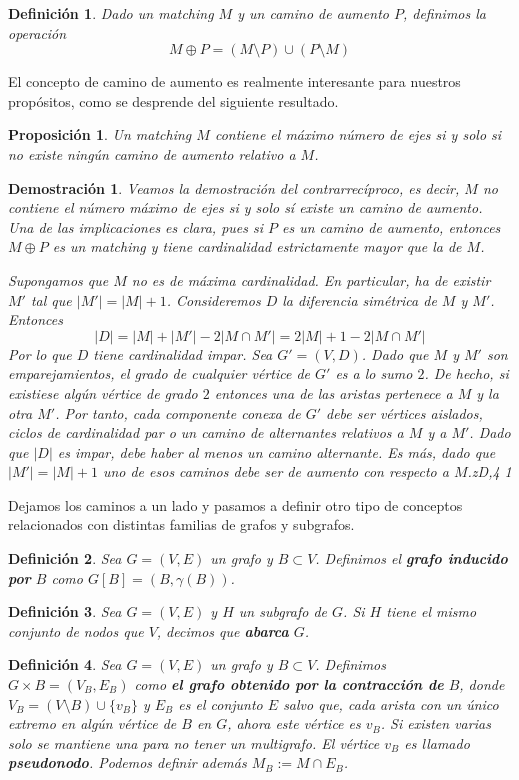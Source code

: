 \documentclass[twoside,a4paper,openright,12pt,tikz]{book}
\newtheorem{defi}{Definici\'on}[section]
\newtheorem{prop}{Proposici\'on}[section]
\newtheorem*{dem}{Demostración}
\begin{document}
\begin{defi} 
Dado un matching $M$ y un camino de aumento $P$, definimos la operación 
$$
M\oplus P = (M\setminus P)\cup (P\setminus M)
$$
\end{defi}
El concepto de camino de aumento es realmente interesante para nuestros propósitos, como se desprende del siguiente resultado.
\begin{prop}
Un matching $M$ contiene el máximo número de ejes si y solo si no existe ningún camino de aumento relativo a $M$.
\end{prop}
\begin{dem}
Veamos la demostración del contrarrecíproco, es decir, $M$ no contiene el número máximo de ejes si y solo sí existe un camino de aumento. Una de las implicaciones es clara, pues si $P$ es un camino de aumento, entonces $M\oplus P$ es un matching y tiene cardinalidad estrictamente mayor que la de $M$. 

Supongamos que $M$ no es de máxima cardinalidad. En particular, ha de existir $M'$ tal que $|M'| = |M| +1$. Consideremos $D$ la diferencia simétrica de $M$ y $M'$. Entonces
$$
|D| = |M|+|M'| -2|M\cap M'| = 2|M|+1-2|M\cap M'|
$$
Por lo que $D$ tiene cardinalidad impar. Sea $G' = (V,D)$. Dado que $M$ y $M'$ son emparejamientos, el grado de cualquier vértice de $G'$ es a lo sumo $2$. De hecho, si existiese algún vértice de grado $2$ entonces una de las aristas pertenece a $M$ y la otra $M'$. Por tanto, cada componente conexa de $G'$ debe ser vértices aislados, ciclos de cardinalidad par o un camino de alternantes relativos a $M$ y a $M'$. Dado que $|D|$ es impar, debe haber al menos un camino alternante. Es más, dado que $|M'|=|M|+1$ uno de esos caminos debe ser de aumento con respecto a $M$.zD,4 1
\end{dem}

Dejamos los caminos a un lado y pasamos a definir otro tipo de conceptos relacionados con distintas familias de grafos y subgrafos.
\begin{defi}
Sea $G=(V,E)$ un grafo y $B \subset V$. Definimos el \textbf{grafo inducido por }$B$ como $G[B] = (B,\gamma(B))$.  
\end{defi}
\begin{defi}
Sea $G=(V,E)$ y $H$ un subgrafo de $G$. Si $H$ tiene el mismo conjunto de nodos que $V$, decimos que \textbf{abarca }$G$.
\end{defi}
\begin{defi}
Sea $G=(V,E)$ un grafo y $B\subset V$. Definimos $G \times B=(V_B,E_B)$ como \textbf{el grafo obtenido por la contracción de} $B$, donde $V_B = (V \setminus B)\cup \{v_B\}$ y $E_B$ es el conjunto $E$ salvo que, cada arista con un único extremo en algún vértice de $B$ en $G$, ahora este vértice es $v_B$. Si existen varias solo se mantiene una para no tener un multigrafo. El vértice $v_B$ es llamado \textbf{pseudonodo}. Podemos definir además $M_B:= M\cap E_B$.
\end{defi}
\end{document}
